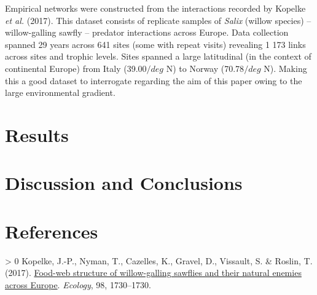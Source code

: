 \documentclass[10pt,oneside]{article}
\newlength{\cslhangindent}
\newenvironment{CSLReferences}[3] %
 {%
  \setlength{\parindent}{0pt}
  \ifodd #1 \everypar{\setlength{\hangindent}{\cslhangindent}}\ignorespaces\fi
  \ifnum #2 > 0
  \setlength{\parskip}{#2\baselineskip}
  \fi
 }%
 {}
\begin{document}
Empirical networks were constructed from the interactions recorded by
Kopelke \emph{et al.} (2017). This dataset consists of replicate samples
of \emph{Salix} (willow species) -- willow-galling sawfly -- predator
interactions across Europe. Data collection spanned 29 years across 641
sites (some with repeat visits) revealing 1 173 links across sites and
trophic levels. Sites spanned a large latitudinal (in the context of
continental Europe) from Italy (39.00\(/deg\) N) to Norway
(70.78\(/deg\) N). Making this a good dataset to interrogate regarding
the aim of this paper owing to the large environmental gradient.

\hypertarget{results}{%
\section{Results}\label{results}}

\hypertarget{discussion-and-conclusions}{%
\section{Discussion and Conclusions}\label{discussion-and-conclusions}}

\hypertarget{references}{%
\section*{References}\label{references}}

\hypertarget{refs}{}
\begin{CSLReferences}{1}{0}
\leavevmode{}%
Kopelke, J.-P., Nyman, T., Cazelles, K., Gravel, D., Vissault, S. \&
Roslin, T. (2017). \href{https://doi.org/10.1002/ecy.1832}{Food-web
structure of willow-galling sawflies and their natural enemies across
Europe}. \emph{Ecology}, 98, 1730--1730.

\end{CSLReferences}
\end{document}
